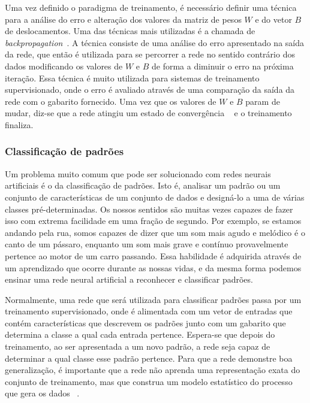Uma vez definido o paradigma de treinamento, é necessário definir uma técnica para a análise do erro e alteração dos valores da matriz de pesos $W$ e do vetor $B$ de deslocamentos. Uma das técnicas mais utilizadas é a chamada de \textit{backpropagation}~\cite{DeepLearning, ZhangNNSurvey}. A técnica consiste de uma análise do erro apresentado na saída da rede, que então é utilizada para se percorrer a rede no sentido contrário dos dados modificando os valores de $W$ e $B$ de forma a diminuir o erro na próxima iteração. Essa técnica é muito utilizada para sistemas de treinamento supervisionado, onde o erro é avaliado através de uma comparação da saída da rede com o gabarito fornecido. Uma vez que os valores de $W$ e $B$ param de mudar, diz-se que a rede atingiu um estado de convergência ~\cite{Kosabov} e o treinamento finaliza.


\subsubsection{Classificação de padrões}




Um problema muito comum que pode ser solucionado com redes neurais artificiais é o da classificação de padrões. Isto é, analisar um padrão ou um conjunto de características de um conjunto de dados e designá-lo a uma de várias classes pré-determinadas. Os nossos sentidos são muitas vezes capazes de fazer isso com extrema facilidade em uma fração de segundo. Por exemplo, se estamos andando pela rua, somos capazes de dizer que um som mais agudo e melódico é o canto de um pássaro, enquanto um som mais grave e contínuo provavelmente pertence ao motor de um carro passando. Essa habilidade é adquirida através de um aprendizado que ocorre durante as nossas vidas, e da mesma forma podemos ensinar uma rede neural artificial a reconhecer e classificar padrões.

Normalmente, uma rede que será utilizada para classificar padrões passa por um treinamento supervisionado, onde é alimentada com um vetor de entradas que contém características que descrevem os padrões junto com um gabarito que determina a classe a qual cada entrada pertence. Espera-se que depois do treinamento, ao ser apresentada a um novo padrão, a rede seja capaz de determinar a qual classe esse padrão pertence. Para que a rede demonstre boa generalização, é importante que a rede não aprenda uma representação exata do conjunto de treinamento, mas que construa um modelo estatístico do processo que gera os dados ~\cite{NNForPR}.

